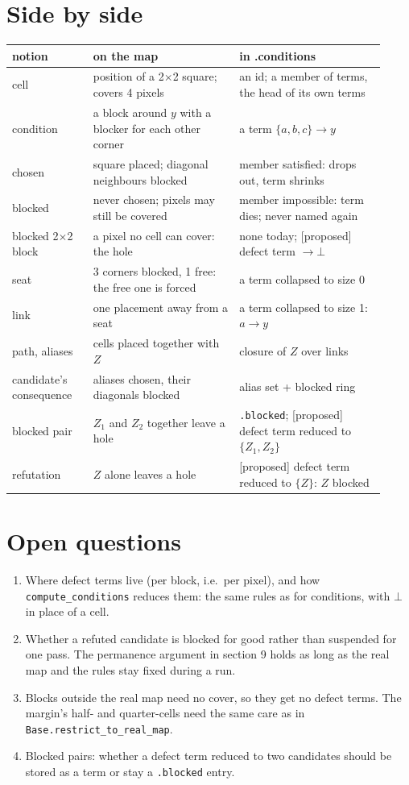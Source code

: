 \documentclass[10pt,a4paper]{article}
\newcommand{\proposed}{\textsf{\scriptsize\color{candc}[proposed]}}
\newcommand{\code}[1]{\texttt{#1}}
\newcommand{\T}[1]{\ensuremath{\{#1\}}}
\begin{document}
\section*{Side by side}
\begin{center}\small
\begin{tabular}{@{}p{0.2\linewidth}p{0.36\linewidth}p{0.36\linewidth}@{}}
\toprule
notion & on the map & in .conditions\\
\midrule
cell & position of a 2$\times$2 square; covers 4 pixels & an id; a member of terms, the head of its own terms\\
condition & a block around $y$ with a blocker for each other corner & a term $\T{a,b,c}\to y$\\
chosen & square placed; diagonal neighbours blocked & member satisfied: drops out, term shrinks\\
blocked & never chosen; pixels may still be covered & member impossible: term dies; never named again\\
blocked 2$\times$2 block & a pixel no cell can cover: the hole & none today; \proposed{} defect term $\to\bot$\\
seat & 3 corners blocked, 1 free: the free one is forced & a term collapsed to size 0\\
link & one placement away from a seat & a term collapsed to size 1: $a\to y$\\
path, aliases & cells placed together with $Z$ & closure of $Z$ over links\\
candidate's consequence & aliases chosen, their diagonals blocked & alias set + blocked ring\\
blocked pair & $Z_1$ and $Z_2$ together leave a hole & \code{.blocked}; \proposed{} defect term reduced to $\T{Z_1,Z_2}$\\
refutation & $Z$ alone leaves a hole & \proposed{} defect term reduced to $\T{Z}$: $Z$ blocked\\
\bottomrule
\end{tabular}
\end{center}

\section*{Open questions}
\begin{enumerate}[leftmargin=*,itemsep=0.3em]
\item Where defect terms live (per block, i.e.\ per pixel), and how \code{compute\_conditions} reduces them: the same rules as for conditions, with $\bot$ in place of a cell.
\item Whether a refuted candidate is blocked for good rather than suspended for one pass. The permanence argument in section 9 holds as long as the real map and the rules stay fixed during a run.
\item Blocks outside the real map need no cover, so they get no defect terms. The margin's half- and quarter-cells need the same care as in \code{Base.restrict\_to\_real\_map}.
\item Blocked pairs: whether a defect term reduced to two candidates should be stored as a term or stay a \code{.blocked} entry.
\end{enumerate}
\end{document}
